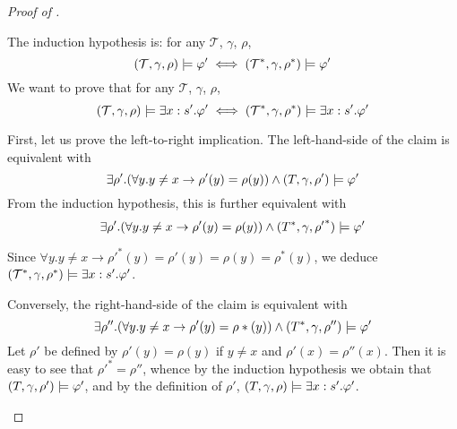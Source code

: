 \begin{proof}[Proof of ]
\begin{itemize}
    The induction hypothesis is: for any $\mathcal{T}$, $\gamma$, $\rho$, 
        $$(\mathcal{T}, \gamma, \rho) \models \varphi' \iff (\mathcal{T}^*, \gamma, \rho^\ast) \models \varphi'$$
    We want to prove that for any $\mathcal{T}$, $\gamma$, $\rho$, 
        $$(\mathcal{T}, \gamma, \rho) \models \exists x:s'. \varphi' \iff (\mathcal{T}^*, \gamma, \rho^\ast) \models \exists x:s'.\varphi'$$
    
    First, let us prove the left-to-right implication.
    The left-hand-side of the claim is equivalent with
    $$\exists \rho'. (\forall y. y \neq x \to \rho'(y) = \rho(y)) \wedge (T, \gamma, \rho') \models \varphi'$$
    From the induction hypothesis, this is further equivalent with
    $$\exists \rho'. (\forall y. y \neq x \to \rho'(y) = \rho(y)) \wedge (T^\ast, \gamma, {\rho'}^\ast) \models \varphi'$$
    
    Since $\forall y. y \neq x \to {\rho'}^\ast(y) = \rho'(y) = \rho(y) = \rho^\ast(y)$, we deduce $(\mathcal{T}^*, \gamma, \rho^\ast) \models \exists x:s'.\varphi'$.
    
    Conversely, the right-hand-side of the claim is equivalent with
    $$\exists \rho''. (\forall y. y \neq x \to \rho'(y) = \rho\ast(y)) \wedge (T^\ast, \gamma, \rho'') \models \varphi'$$
    Let $\rho'$ be defined by $\rho'(y) = \rho(y)$ if $y\neq x$ and $\rho'(x) = \rho''(x)$. Then it is
    easy to see that ${\rho'}^\ast = \rho''$, whence by the induction hypothesis we obtain that
    $(T, \gamma, \rho') \models \varphi'$, and by the definition of $\rho'$, $(T, \gamma, \rho) \models \exists x:s'. \varphi'$.
 \end{itemize}
\end{proof}

